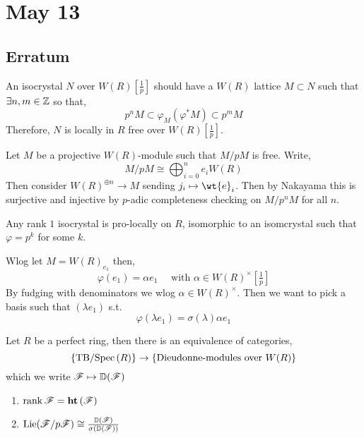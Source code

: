 \documentclass[12pt]{article}
\begin{document}
\section{May 13}

\subsection{Erratum}


An isocrystal $N$ over $W(R)[\frac{1}{p}]$ should have a $W(R)$ lattice $M \subset N$ such that $\exists n,m \in \mathbb{Z}$ so that,
\[ p^n M \subset \varphi_M(\varphi^* M) \subset p^m M \]
Therefore, $N$ is \etale locally in $R$ free over $W(R)[\tfrac{1}{p}]$. 

\begin{rmk}
Let $M$ be a projective $W(R)$-module such that $M / p M$ is free. Write,
\[ M / p M \cong \bigoplus_{i = 0}^n e_i W(R) \]
Then consider $W(R)^{\oplus n} \to M$ sending $j_i \mapsto \wt{e}_i$. Then by Nakayama this is surjective and injective by $p$-adic completeness checking on $M / p^n M$ for all $n$. 
\end{rmk}


\begin{exercise}
Any rank $1$ isocrystal is pro-\etale locally on $R$, isomorphic to an isomcrystal such that $\varphi = p^k$ for some $k$.
\end{exercise}

Wlog let $M = W(R)_{e_1}$ then,
\[ \varphi(e_1) = \alpha e_1 \quad \text{ with } \alpha \in W(R)^\times [ \tfrac{1}{p} ] \]
By fudging with denominators we wlog $\alpha \in W(R)^\times$. Then we want to pick a basis such that $(\lambda e_1)$ s.t. 
\[ \varphi(\lambda e_1) = \sigma(\lambda) \alpha e_1 \]

\newcommand{\Lie}{\mathrm{Lie}}
\renewcommand{\D}{\mathbb{D}}

\begin{theorem}[Gabber]
Let $R$ be a perfect ring, then there is an equivalence of categories,
\[ \{ \text{TB} / \mathrm{Spec}\left( R \right) \} \to \{ \text{Dieudonne-modules over } W(R) \} \]
which we write $\F \mapsto \D(\F)$
\begin{enumerate}
\item $\operatorname{\mathrm{rank}} \mathscr{F} = \mathbf{ht}\left( \mathscr{F} \right)$
\item $\Lie(\F / p \F) \cong \frac{\D(\F)}{\sigma(\D(\F))}$
\end{enumerate}
\end{theorem}

\newcommand{\perf}{\mathrm{perf}}
\end{document}
